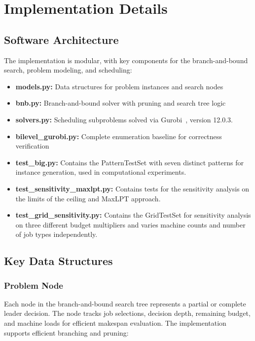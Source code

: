 
\chapter{Implementation Details}
\label{sec:implementation}

\section{Software Architecture}

The implementation is modular, with key components for the branch-and-bound search, problem modeling, and scheduling:

\begin{itemize}
    \item \textbf{models.py:} Data structures for problem instances and search nodes
    \item \textbf{bnb.py:} Branch-and-bound solver with pruning and search tree logic
    \item \textbf{solvers.py:} Scheduling subproblems solved via Gurobi~\cite{gurobi}, version 12.0.3. 
    \item \textbf{bilevel\_gurobi.py:} Complete enumeration baseline for correctness verification
    \item \textbf{test\_big.py:} Contains the PatternTestSet with seven distinct patterns for instance generation, used in computational experiments.
    \item \textbf{test\_sensitivity\_maxlpt.py:} Contains tests for the sensitivity analysis on the limits of the ceiling and MaxLPT approach.
    \item \textbf{test\_grid\_sensitivity.py:} Contains the GridTestSet for sensitivity analysis on three different budget multipliers and varies machine counts and number of job types independently.
\end{itemize}

\section{Key Data Structures}

\subsection{Problem Node}


Each node in the branch-and-bound search tree represents a partial or complete leader decision. The node tracks job selections, decision depth, remaining budget, and machine loads for efficient makespan evaluation. The implementation supports efficient branching and pruning:


